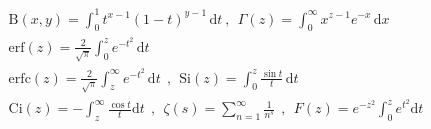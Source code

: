 \documentclass[twoside,nofonts,internet]{askhseis}
\newcommand{\BetaFun}[2]{\mathrm{B}(#1,#2)=\int_{0}^{1}{t^{#1-1}(1-t)^{#2-1}\,\mathrm{d}t}}
\newcommand{\GammaFun}[1]{\Gamma(#1)=\int_{0}^{\infty}{x^{#1-1}e^{-x}\,\mathrm{d}x}}
\newcommand{\ErrorFun}[1]{\mathrm{erf}(#1)=\frac{2}{\sqrt{\pi}}\int_{0}^{#1}{e^{-t^2}\,\mathrm{d}t}}
\newcommand{\ErrorCFun}[1]{\mathrm{erfc}(#1)=\frac{2}{\sqrt{\pi}}\int_{#1}^{\infty}{e^{-t^2}\,\mathrm{d}t}}
\newcommand{\SiInt}[1]{\mathrm{Si}(#1)=\int_{0}^{#1}{\frac{\sin{t}}{t}}\,\mathrm{d}t}
\newcommand{\CiInt}[1]{\mathrm{Ci}(#1)=-\int_{#1}^{\infty}\frac{\cos t}{t}\mathrm{d}t}
\newcommand{\ZetaFun}[1]{\zeta(#1)=\sum_{n=1}^{\infty}{\frac{1}{n^#1}}}
\newcommand{\DawsonInt}[1]{F\left(#1\right)=e^{-#1^{2}}\int_{0}^{#1}e^{t^{2}}\mathrm{d}t}
\begin{document}
\begin{gather*}
\BetaFun{x}{y}\ ,\ \ \GammaFun{z}\\
\ErrorFun{z}\\
\ErrorCFun{z}\ \ ,\ \ \SiInt{z}\\
\CiInt{z}\ \ ,\ \ \ZetaFun{s}\ \ ,\ \ \DawsonInt{z}
\end{gather*}
\end{document}
